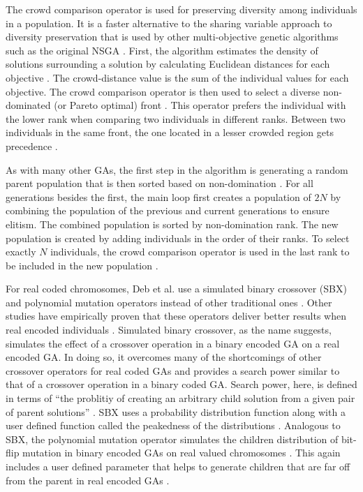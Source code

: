   The crowd comparison operator is used for preserving diversity among individuals in a population. It is a faster alternative to the sharing variable approach to diversity preservation that is used by other multi-objective genetic algorithms such as the original NSGA \cite{Deb2002}. First, the algorithm estimates the density of solutions surrounding a solution by calculating Euclidean distances for each objective \cite{Deb2002}. The crowd-distance value is the sum of the individual values for each objective. The crowd comparison operator is then used to select a diverse non-dominated (or Pareto optimal) front \cite{Deb2002}. This operator prefers the individual with the lower rank when comparing two individuals in different ranks. Between two individuals in the same front, the one located in a lesser crowded region gets precedence \cite{Deb2002}.
  
  As with many other GAs, the first step in the algorithm is generating a random parent population that is then sorted based on non-domination \cite{Deb2002}. For all generations besides the first, the main loop first creates a population of $2N$ by combining the population of the previous and current generations to ensure elitism. The combined population is sorted by non-domination rank. The new population is created by adding individuals in the order of their ranks. To select exactly $N$ individuals, the crowd comparison operator is used in the last rank to be included in the new population \cite{Deb2002}.
  
  For real coded chromosomes, Deb et al. use a simulated binary crossover (SBX) and polynomial mutation operators instead of other traditional ones \cite{Deb2002}. Other studies have empirically proven that these operators deliver better results when real encoded individuals \cite{agrawal1994}. Simulated binary crossover, as the name suggests, simulates the effect of a crossover operation in a binary encoded GA on a real encoded GA. In doing so, it overcomes many of the shortcomings of other crossover operators for real coded GAs \cite{agrawal1994} and provides a search power similar to that of a crossover operation in a binary coded GA. Search power, here, is defined in terms of ``the problitiy of creating an arbitrary child solution from a given pair of parent solutions'' \cite{agrawal1994}. SBX uses a probability distribution function along with a user defined function called the peakedness of the distributions \cite{bandaru2011}. Analogous to SBX, the polynomial mutation operator simulates the children distribution of bit-flip mutation in binary encoded GAs on real valued chromosomes \cite{bandaru2011}. This again includes a user defined parameter that helps to generate children that are far off from the parent in real encoded GAs \cite{bandaru2011}.
  
  